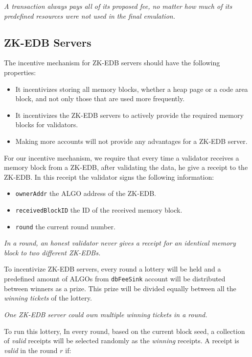 \documentclass[11pt, A4]{article}
\begin{document}
    \emph{A transaction always pays all of its proposed fee, no matter how much of its predefined resources were not
    used in the final emulation.}

    \subsection{ZK-EDB Servers}\label{subsec:zk-edb-servers}

    The incentive mechanism for ZK-EDB servers should have the following properties:

    \begin{itemize}
        \item It incentivizes storing all memory blocks, whether a heap page or a code area block, and not only those
        that are used more frequently.
        \item It incentivizes the ZK-EDB servers to actively provide the required memory blocks for validators.
        \item Making more accounts will not provide any advantages for a ZK-EDB server.
    \end{itemize}

    For our incentive mechanism, we require that every time a validator receives a memory block from a ZK-EDB, after
    validating the data, he give a receipt to the ZK-EDB. In this receipt the validator signs the following information:

    \begin{itemize}
        \item \texttt{ownerAddr} the ALGO address of the ZK-EDB\@.
        \item \texttt{receivedBlockID} the ID of the received memory block.
        \item \texttt{round} the current round number.
    \end{itemize}

    \emph{In a round, an honest validator never gives a receipt for an identical memory block to two different ZK-EDBs.}

    To incentivize ZK-EDB servers, every round a lottery will be held and a predefined amount of ALGOs from
    \texttt{dbFeeSink} account will be distributed between winners as a prize. This prize will be divided equally
    between all the \emph{winning tickets} of the lottery.

    \emph{One ZK-EDB server could own multiple winning tickets in a round.}

    To run this lottery, In every round, based on the current block seed, a collection of \emph{valid} receipts will be
    selected randomly as the \emph{winning} receipts. A receipt is \emph{valid} in the round \(r\) if:
\end{document}
